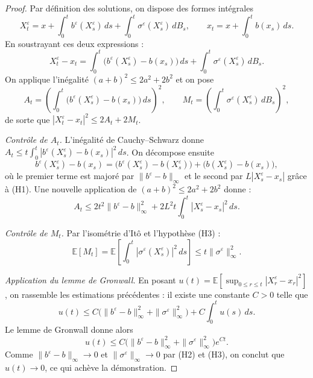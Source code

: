 \documentclass[12pt,a4paper]{article}
\theoremstyle{remark}
\begin{document}
\begin{proof}
Par définition des solutions, on dispose des formes intégrales
\[
  X^\varepsilon_t = x + \int_0^t b^\varepsilon(X^\varepsilon_s)\,ds + \int_0^t \sigma^\varepsilon(X^\varepsilon_s)\,dB_s,
  \qquad
  x_t = x + \int_0^t b(x_s)\,ds.
\]
En soustrayant ces deux expressions :
\[
  X^\varepsilon_t - x_t
  = \int_0^t \bigl(b^\varepsilon(X^\varepsilon_s) - b(x_s)\bigr)\,ds
  + \int_0^t \sigma^\varepsilon(X^\varepsilon_s)\,dB_s.
\]
On applique l'inégalité $(a+b)^2 \leq 2a^2 + 2b^2$ et on pose
\[
  A_t = \left(\int_0^t \bigl(b^\varepsilon(X^\varepsilon_s) - b(x_s)\bigr)\,ds\right)^{\!2},
  \qquad
  M_t = \left(\int_0^t \sigma^\varepsilon(X^\varepsilon_s)\,dB_s\right)^{\!2},
\]
de sorte que $|X^\varepsilon_t - x_t|^2 \leq 2A_t + 2M_t$.
 
\medskip
\noindent\textit{Contrôle de $A_t$.}
L'inégalité de Cauchy--Schwarz donne $A_t \leq t\int_0^t |b^\varepsilon(X^\varepsilon_s) - b(x_s)|^2\,ds$.
On décompose ensuite
\[
  b^\varepsilon(X^\varepsilon_s) - b(x_s)
  = \bigl(b^\varepsilon(X^\varepsilon_s) - b(X^\varepsilon_s)\bigr)
  + \bigl(b(X^\varepsilon_s) - b(x_s)\bigr),
\]
où le premier terme est majoré par $\|b^\varepsilon - b\|_\infty$ et le second par $L|X^\varepsilon_s - x_s|$
grâce à (H1). Une nouvelle application de $(a+b)^2 \leq 2a^2+2b^2$ donne :
\[
  A_t \leq 2t^2\|b^\varepsilon - b\|_\infty^2 + 2L^2 t\int_0^t |X^\varepsilon_s - x_s|^2\,ds.
\]
 
\medskip
\noindent\textit{Contrôle de $M_t$.}
Par l'isométrie d'It\^{o} et l'hypothèse (H3) :
\[
  \mathbb{E}[M_t]
  = \mathbb{E}\!\left[\int_0^t |\sigma^\varepsilon(X^\varepsilon_s)|^2\,ds\right]
  \leq t\|\sigma^\varepsilon\|_\infty^2.
\]
 
\medskip
\noindent\textit{Application du lemme de Gronwall.}
En posant $u(t) = \mathbb{E}\!\left[\sup_{0 \leq r \leq t}|X^\varepsilon_r - x_r|^2\right]$,
on rassemble les estimations précédentes : il existe une constante $C > 0$ telle que
\[
  u(t) \leq C\bigl(\|b^\varepsilon - b\|_\infty^2 + \|\sigma^\varepsilon\|_\infty^2\bigr)
  + C\int_0^t u(s)\,ds.
\]
Le lemme de Gronwall donne alors
\[
  u(t) \leq C\bigl(\|b^\varepsilon - b\|_\infty^2 + \|\sigma^\varepsilon\|_\infty^2\bigr)e^{Ct}.
\]
Comme $\|b^\varepsilon - b\|_\infty \to 0$ et $\|\sigma^\varepsilon\|_\infty \to 0$ par (H2) et (H3),
on conclut que $u(t) \to 0$, ce qui achève la démonstration.
\end{proof}
 
 
 
\end{document}

